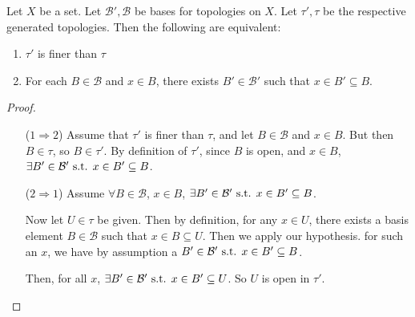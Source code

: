 \documentclass[12pt, twosided]{article}
\begin{document}
\begin{prop}
  Let \(X\) be a set. Let \(\mathcal{B}\prime, \mathcal{B}\) be bases for topologies on \(X\). Let \(\tau\prime, \tau\) be the respective generated topologies. Then the following are equivalent:
  \begin{enumerate}
  \item \(\tau\prime\) is finer than \(\tau\)
  \item For each \(B \in \mathcal{B}\) and \(x \in B\), there exists \(B\prime \in \mathcal{B}\prime\) such that \(x \in B\prime \subseteq B\). 
  \end{enumerate}
\end{prop}
\begin{proof} \hphantom{1}
  \begin{enumerate}
  \item [(\(1 \Rightarrow 2\))] Assume that \(\tau\prime\) is finer than \(\tau\), and let \(B \in \mathcal{B}\) and \(x \in B\). But then \(B \in \tau\), so \(B \in \tau\prime\). By definition of \(\tau\prime\), since \(B\) is open, and \(x \in B\), \(\exists B\prime \in \mathcal{B}\prime \st x \in B\prime \subseteq B\).
  \item [(\(2 \Rightarrow 1\))] Assume \(\forall B \in \mathcal{B}\), \(x \in B\), \(\exists B\prime \in \mathcal{B}\prime \st x \in B\prime \subseteq B\).

    Now let \(U \in \tau\) be given. Then by definition, for any \(x \in U\), there exists a basis element \(B \in \mathcal{B}\) such that \(x \in B \subseteq U\). Then we apply our hypothesis. for such an \(x\), we have by assumption a \(B\prime \in \mathcal{B}\prime \st x \in B\prime \subseteq B\).

    Then, for all \(x\), \(\exists B\prime \in \mathcal{B}\prime \st x\in B\prime \subseteq U\). So \(U\) is open in \(\tau\prime\). 
  \end{enumerate}
\end{proof}
\end{document}
